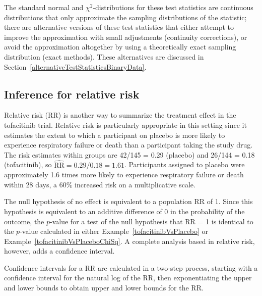 The standard normal and $\chi^2$-distributions for these test statistics are continuous distributions that only approximate the sampling distributions of the statistic; there are alternative versions of these test statistics that either attempt to improve the approximation with small adjustments (continuity corrections), or avoid the approximation altogether by using a theoretically exact sampling distribution (exact methods).  These alternatives are discussed in Section~\ref{alternativeTestStatisticsBinaryData}.

\subsection{Inference for relative risk}
\label{inferenceRelativeRisk}

Relative risk (RR) is another way to summarize the treatment effect in the tofacitinib trial. Relative risk is particularly appropriate in this setting since it estimates the extent to which a participant on placebo is more likely to experience respiratory failure or death than a participant taking the study drug. The risk estimates within groups are 42/145 = 0.29 (placebo) and 26/144 = 0.18 (tofacitinib), so $\widehat{\text{RR}} = 0.29/0.18 = 1.61$. Participants assigned to placebo were approximately 1.6 times more likely to experience respiratory failure or death within 28 days, a 60\% increased risk on a multiplicative scale.

The null hypothesis of no effect is equivalent to a population RR of 1. Since this hypothesis is equivalent to an additive difference of 0 in the probability of the outcome, the $p$-value for a test of the null hypothesis that RR = 1 is identical to the $p$-value calculated in either Example~\ref{tofacitinibVsPlacebo} or Example~\ref{tofacitinibVsPlaceboChiSq}.  A complete analysis based in relative risk, however, adds a confidence interval.
 
Confidence intervals for a RR are calculated in a two-step process, starting with a confidence interval for the natural log of the RR, then exponentiating the upper and lower bounds to obtain upper and lower bounds for the RR.

